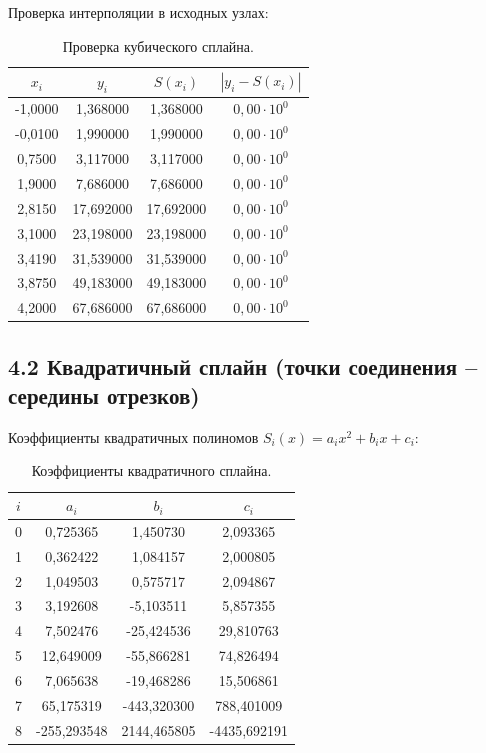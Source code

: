 \documentclass[14pt,a4paper]{extarticle}
\begin{document}
Проверка интерполяции в исходных узлах:

\begin{table}[h]
\centering
\caption{Проверка кубического сплайна.}
\begin{tabular}{|c|c|c|c|}
\hline
$x_i$ & $y_i$ & $S(x_i)$ & $\left|y_i - S(x_i)\right|$ \\ \hline
-1,0000 & 1,368000 & 1,368000 & $0{,}00 \cdot 10^{0}$ \\
-0,0100 & 1,990000 & 1,990000 & $0{,}00 \cdot 10^{0}$ \\
0,7500 & 3,117000 & 3,117000 & $0{,}00 \cdot 10^{0}$ \\
1,9000 & 7,686000 & 7,686000 & $0{,}00 \cdot 10^{0}$ \\
2,8150 & 17,692000 & 17,692000 & $0{,}00 \cdot 10^{0}$ \\
3,1000 & 23,198000 & 23,198000 & $0{,}00 \cdot 10^{0}$ \\
3,4190 & 31,539000 & 31,539000 & $0{,}00 \cdot 10^{0}$ \\
3,8750 & 49,183000 & 49,183000 & $0{,}00 \cdot 10^{0}$ \\
4,2000 & 67,686000 & 67,686000 & $0{,}00 \cdot 10^{0}$ \\ \hline
\end{tabular}
\end{table}

\subsection*{4.2 Квадратичный сплайн (точки соединения -- середины отрезков)}

Коэффициенты квадратичных полиномов $S_i(x) = a_i x^2 + b_i x + c_i$:

\begin{table}[h]
\centering
\caption{Коэффициенты квадратичного сплайна.}
\begin{tabular}{|c|c|c|c|}
\hline
$i$ & $a_i$ & $b_i$ & $c_i$ \\ \hline
0 & 0,725365 & 1,450730 & 2,093365 \\
1 & 0,362422 & 1,084157 & 2,000805 \\
2 & 1,049503 & 0,575717 & 2,094867 \\
3 & 3,192608 & -5,103511 & 5,857355 \\
4 & 7,502476 & -25,424536 & 29,810763 \\
5 & 12,649009 & -55,866281 & 74,826494 \\
6 & 7,065638 & -19,468286 & 15,506861 \\
7 & 65,175319 & -443,320300 & 788,401009 \\
8 & -255,293548 & 2144,465805 & -4435,692191 \\ \hline
\end{tabular}
\end{table}
\end{document}
